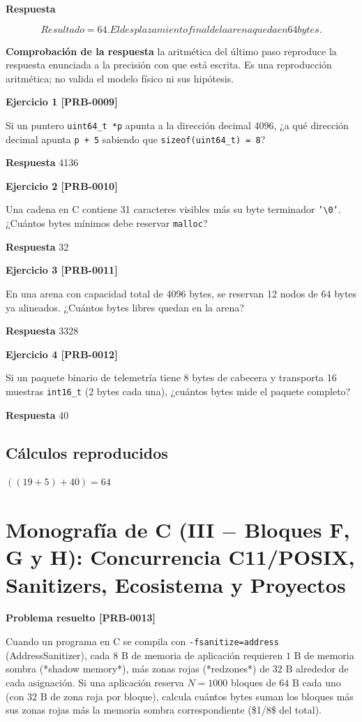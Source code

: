 \documentclass{book}
\begin{document}
\noindent\textbf{Respuesta}

\[
Resultado = 64. El desplazamiento final de la arena queda en 64 bytes.
\]

\noindent\textbf{Comprobación de la respuesta} la aritmética del último paso reproduce la respuesta enunciada a la precisión con que está escrita. Es una reproducción aritmética; no valida el modelo físico ni sus hipótesis.

\noindent\textbf{Ejercicio 1 [PRB-0009]}

Si un puntero \texttt{uint64\_t *p} apunta a la dirección decimal 4096, ¿a qué dirección decimal apunta \texttt{p + 5} sabiendo que \texttt{sizeof(uint64\_t) = 8}?

\noindent\textbf{Respuesta} 4136

\noindent\textbf{Ejercicio 2 [PRB-0010]}

Una cadena en C contiene 31 caracteres visibles más su byte terminador \texttt{'\textbackslash{}0'}. ¿Cuántos bytes mínimos debe reservar \texttt{malloc}?

\noindent\textbf{Respuesta} 32

\noindent\textbf{Ejercicio 3 [PRB-0011]}

En una arena con capacidad total de 4096 bytes, se reservan 12 nodos de 64 bytes ya alineados. ¿Cuántos bytes libres quedan en la arena?

\noindent\textbf{Respuesta} 3328

\noindent\textbf{Ejercicio 4 [PRB-0012]}

Si un paquete binario de telemetría tiene 8 bytes de cabecera y transporta 16 muestras \texttt{int16\_t} (2 bytes cada una), ¿cuántos bytes mide el paquete completo?

\noindent\textbf{Respuesta} 40

\subsection*{Cálculos reproducidos}

\(\left(\left(19+5\right)+40\right) = 64\)

\section{Monografía de C (III \(-\) Bloques F, G y H): Concurrencia C11/POSIX, Sanitizers, Ecosistema y Proyectos}

\noindent\textbf{Problema resuelto [PRB-0013]}

Cuando un programa en C se compila con \texttt{-fsanitize=address} (AddressSanitizer), cada \(8\text{ B}\) de memoria de aplicación requieren \(1\text{ B}\) de memoria sombra (*shadow memory*), más zonas rojas (*redzones*) de \(32\text{ B}\) alrededor de cada asignación. Si una aplicación reserva \(N = 1000\) bloques de \(64\text{ B}\) cada uno (con \(32\text{ B}\) de zona roja por bloque), calcula cuántos bytes suman los bloques más sus zonas rojas más la memoria sombra correspondiente (\$1/8\$ del total).
\end{document}
